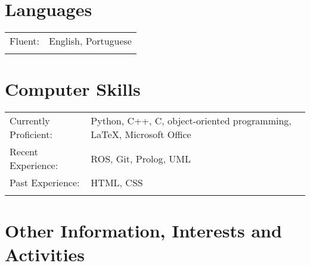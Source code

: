 \documentclass[a4paper,10pt]{article}
\begin{document}
{\begin{tabular}{R{3.5cm} p{10cm}}
\end{tabular}




\section{Languages}

\vspace*{3pt}
\hspace*{-12pt}
\begin{tabular}{R{3.5cm} p{10cm}}
Fluent: & English, Portuguese\\

&\\

\end{tabular}



\section{Computer Skills}

\vspace*{3pt}
\hspace*{-12pt}
\begin{tabular}{R{3.5cm} p{10cm}}
Currently Proficient: & Python, C++, C, object-oriented programming, \LaTeX, Microsoft Office \\
Recent Experience: & ROS, Git, Prolog, UML\\
Past Experience: & HTML, CSS \\
&\\
\end{tabular}



\section{Other Information, Interests and Activities}

}
\end{document}
